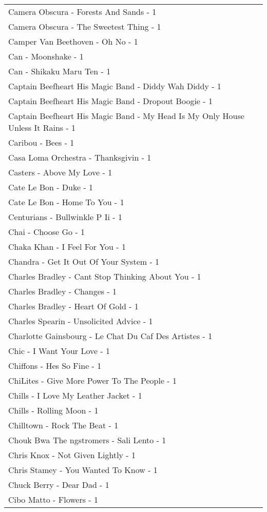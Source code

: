 \documentclass[
]{article}
\begin{document}
\begin{longtable}{l}
Camera Obscura - Forests And Sands - 1 \\ 
Camera Obscura - The Sweetest Thing - 1 \\ 
Camper Van Beethoven - Oh No - 1 \\ 
Can - Moonshake - 1 \\ 
Can - Shikaku Maru Ten - 1 \\ 
Captain Beefheart His Magic Band - Diddy Wah Diddy - 1 \\ 
Captain Beefheart His Magic Band - Dropout Boogie - 1 \\ 
Captain Beefheart His Magic Band - My Head Is My Only House Unless It Rains - 1 \\ 
Caribou - Bees - 1 \\ 
Casa Loma Orchestra - Thanksgivin - 1 \\ 
Casters - Above My Love - 1 \\ 
Cate Le Bon - Duke - 1 \\ 
Cate Le Bon - Home To You - 1 \\ 
Centurians - Bullwinkle P Ii - 1 \\ 
Chai - Choose Go - 1 \\ 
Chaka Khan - I Feel For You - 1 \\ 
Chandra - Get It Out Of Your System - 1 \\ 
Charles Bradley - Cant Stop Thinking About You - 1 \\ 
Charles Bradley - Changes - 1 \\ 
Charles Bradley - Heart Of Gold - 1 \\ 
Charles Spearin - Unsolicited Advice - 1 \\ 
Charlotte Gainsbourg - Le Chat Du Caf Des Artistes - 1 \\ 
Chic - I Want Your Love - 1 \\ 
Chiffons - Hes So Fine - 1 \\ 
ChiLites - Give More Power To The People - 1 \\ 
Chills - I Love My Leather Jacket - 1 \\ 
Chills - Rolling Moon - 1 \\ 
Chilltown - Rock The Beat - 1 \\ 
Chouk Bwa The ngstromers - Sali Lento - 1 \\ 
Chris Knox - Not Given Lightly - 1 \\ 
Chris Stamey - You Wanted To Know - 1 \\ 
Chuck Berry - Dear Dad - 1 \\ 
Cibo Matto - Flowers - 1 \\ 

\end{longtable}
\end{document}
